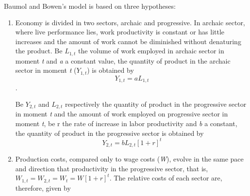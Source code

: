 \documentclass[a4paper, 12pt, openright, oneside, german, french, brazil, english, article]{abntex2}
\begin{document}
		Baumol and Bowen's model is based on three hypotheses:
	
	\begin{enumerate}
		
		\item Economy is divided in two sectors, archaic and progressive. In archaic sector, where live performance lies, work productivity is constant or has little increases and the amount of work cannot be diminished without denaturing the product. Be $L_{1,t}$ the volume of work employed in archaic sector in moment \textit{t} and \textit{a} a constant value, the quantity of product in the archaic sector in moment \textit{t} ($Y_{1,t}$) is obtained by $$Y_{1,t} = aL_{1,t}$$.
		
		
		Be $Y_{2,t}$ and $L_{2,t}$ respectively the quantity of product in the progressive sector in moment \textit{t} and the amount of work employed on progressive sector in moment \textit{t}, be r the rate of increase in labor productivity and \textit{b} a constant, the quantity of product in the progressive sector is obtained by $$Y_{2,t} = bL_{2,t}[1+r]^t $$
		
		
		\item Production costs, compared only to wage costs (\textit{W}), evolve in the same pace and direction that productivity in the progressive sector, that is, $W_{1,t} = W_{2,t} = W_t = W[1+r]^t$. The relative costs of each sector are, therefore, given by
		

\end{enumerate}
\end{document}
